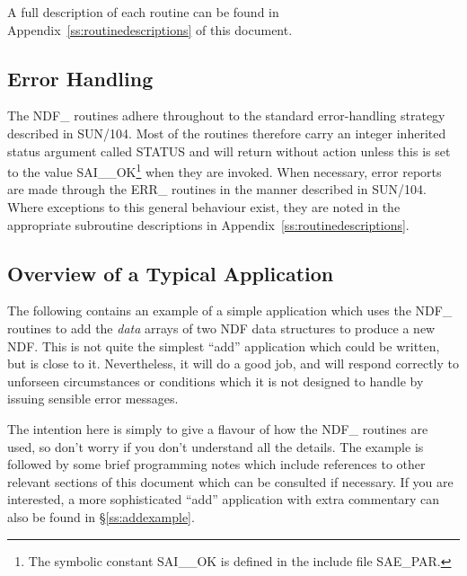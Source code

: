 \documentclass[twoside,11pt]{article}
\newcommand{\xref}[3]{#1}
\newcommand{\xlabel}[1]{}
\newcommand{\st}[1]{{\em{#1}}}
\begin{document}
A full description of each routine can be found in
Appendix~\ref{ss:routinedescriptions} of this document.

\subsection{\xlabel{error_handling}\label{ss:errorhandling}Error Handling}

The NDF\_ routines adhere throughout to the standard error-handling
strategy described in \xref{SUN/104}{sun104}{err}.  Most of the
routines therefore carry an integer \xref{inherited
status}{sun104}{inherited_status} argument called STATUS and will
return without action unless this is set to the value
SAI\_\_OK\footnote{The symbolic constant SAI\_\_OK is defined in the
include file SAE\_PAR.} when they are invoked.  When necessary, error
reports are made through the ERR\_ routines in the manner described in
SUN/104.  Where exceptions to this general behaviour exist, they are
noted in the appropriate subroutine descriptions in
Appendix~\ref{ss:routinedescriptions}.

\subsection{\xlabel{overview_of_a_typical_application}\label{ss:applicationoverview}Overview of a Typical Application}

The following contains an example of a simple application which uses the
NDF\_ routines to add the \st{data\/} arrays of two NDF data structures to
produce a new NDF. 
This is not quite the simplest ``add'' application which could be written,
but is close to it. 
Nevertheless, it will do a good job, and will respond correctly to unforseen
circumstances or conditions which it is not designed to handle by issuing
sensible error messages. 

The intention here is simply to give a flavour of how the NDF\_ routines are
used, so don't worry if you don't understand all the details. 
The example is followed by some brief programming notes which include 
references to other relevant sections of this document which can be
consulted if necessary. 
If you are interested, a more sophisticated ``add'' application with extra
commentary can also be found in \S\ref{ss:addexample}. 
\end{document}
